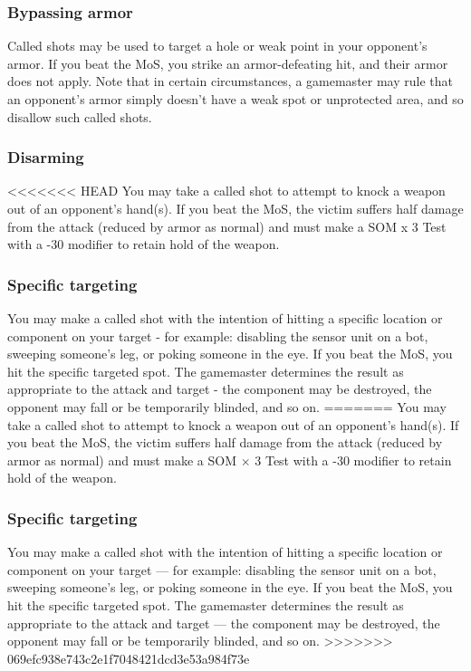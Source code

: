 \subsubsection{Bypassing armor}

Called shots may be used to target a hole or weak point in your opponent’s armor. If you beat the MoS, you strike an armor-defeating hit, and their armor does not apply. Note that in certain circumstances, a gamemaster may rule that an opponent’s armor simply doesn’t have a weak spot or unprotected area, and so disallow such called shots.

\subsubsection{Disarming}

<<<<<<< HEAD
You may take a called shot to attempt to knock a weapon out of an opponent’s hand(s). If you beat the MoS, the victim suffers half damage from the attack (reduced by armor as normal) and must make a SOM x 3 Test with a -30 modifier to retain hold of the weapon.

\subsubsection{Specific targeting}

You may make a called shot with the intention of hitting a specific location or component on your target - for example: disabling the sensor unit on a bot, sweeping someone’s leg, or poking someone in the eye. If you beat the MoS, you hit the specific targeted spot. The gamemaster determines the result as appropriate to the attack and target - the component may be destroyed, the opponent may fall or be temporarily blinded, and so on.
=======
You may take a called shot to attempt to knock a weapon out of an opponent’s hand(s). If you beat the MoS, the victim suffers half damage from the attack (reduced by armor as normal) and must make a SOM $\times$ 3 Test with a -30 modifier to retain hold of the weapon.

\subsubsection{Specific targeting}

You may make a called shot with the intention of hitting a specific location or component on your target --- for example: disabling the sensor unit on a bot, sweeping someone’s leg, or poking someone in the eye. If you beat the MoS, you hit the specific targeted spot. The gamemaster determines the result as appropriate to the attack and target --- the component may be destroyed, the opponent may fall or be temporarily blinded, and so on.
>>>>>>> 069efc938e743c2e1f7048421dcd3e53a984f73e

